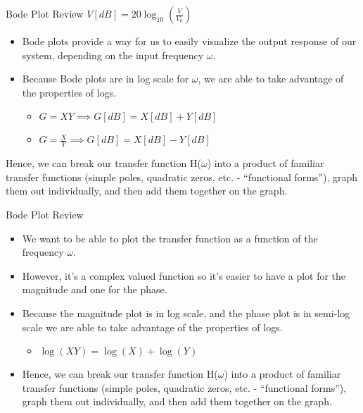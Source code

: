     \begin{frame}{Bode Plot Review}
        $V[dB] = 20\log_{10}(\frac{V}{V_0})$
        \begin{itemize}
            \item Bode plots provide a way for us to easily visualize the output response of our system, depending on the input frequency $\omega$. 
            \item Because Bode plots are in log scale for $\omega$, we are able to take advantage of the properties of logs.
            \begin{itemize}
                \item $G = XY \implies G[dB] = X[dB] + Y[dB]$
                \item $G = \frac{X}{Y} \implies G[dB] = X[dB] - Y[dB]$
            \end{itemize}
        \end{itemize}
        Hence, we can break our transfer function H($\omega$) into a product of familiar transfer functions (simple poles, quadratic zeros, etc. - “functional forms”), graph them out individually, and then add them together on the graph.  
    \end{frame}
    \begin{frame}{Bode Plot Review}
        \begin{itemize}
            \item We want to be able to plot the transfer function as a function of the frequency $\omega$. 
            \item However, it’s a complex valued function so it’s easier to have a plot for the magnitude and one for the phase. 
            \item Because the magnitude plot is in log scale, and the phase plot is in semi-log scale we are able to take advantage of the properties of logs. 
            \begin{itemize}
                \item $\log(XY) = \log(X) + \log(Y)$
            \end{itemize}
            \item Hence, we can break our transfer function H($\omega$) into a product of familiar transfer functions (simple poles, quadratic zeros, etc. - “functional forms”), graph them out individually, and then add them together on the graph.
        \end{itemize}
    \end{frame}
